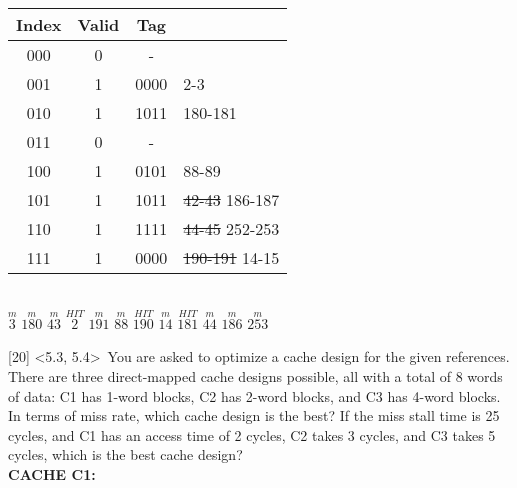 \documentclass[12pt]{article}
\begin{document}
	\begin{center}
		\begin{tabular}{ |c|c|c|l| } 
			\hline
			Index & Valid & Tag &  \\
			\hline
			000 & 0 & - & \\
			\hline
			001 & 1 & 0000 & 2-3 \\
			\hline
			010 & 1 & 1011 & 180-181 \\
			\hline
			011 & 0 & - & \\
			\hline
			100 & 1 & 0101 & 88-89\\
			\hline
			101 & 1 & 1011 & \sout{42-43} 186-187 \\
			\hline
			110 & 1 & 1111 & \sout{44-45} 252-253 \\
			\hline
			111 & 1 & 0000 & \sout{190-191} 14-15\\
			\hline
			
		\end{tabular}
		\vspace{0.3cm} \\
		
		$\overset{m}{3}$ $\overset{m}{180}$ $\overset{m}{43}$ $\overset{HIT}{2}$ $\overset{m}{191}$ $\overset{m}{88}$ $\overset{HIT}{190}$ $\overset{m}{14}$ $\overset{HIT}{181}$ $\overset{m}{44}$ $\overset{m}{186}$ $\overset{m}{253}$  \vspace{0.5cm} \\
		
	\end{center}
	
		\noindent {} 
	[20] \textless5.3, 5.4\textgreater \ You are asked to optimize a cache design for the given
	references. There are three direct-mapped cache designs possible, all with a total of 8
	words of data: C1 has 1-word blocks, C2 has 2-word blocks, and C3 has 4-word blocks.
	In terms of miss rate, which cache design is the best? If the miss stall time is 25 cycles,
	and C1 has an access time of 2 cycles, C2 takes 3 cycles, and C3 takes 5 cycles, which is
	the best cache design? \\
	
	\noindent \textbf{CACHE C1:}  \\
	
\end{document}

